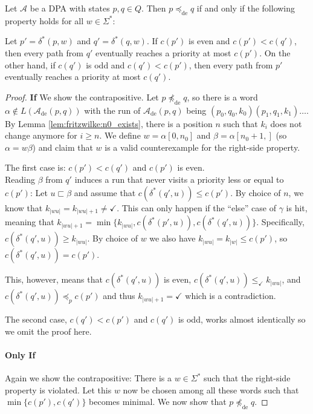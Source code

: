 \begin{lem}
\label{lem:fwe:preceq_alternative}
	Let $\mathcal{A}$ be a DPA with states $p, q \in Q$. Then $p \preceq_\text{de} q$ if and only if the following property holds for all $w \in \Sigma^*$: 
	
	Let $p' = \delta^*(p, w)$ and $q' = \delta^*(q, w)$. If $c(p')$ is even and $c(p') < c(q')$, then every path from $q'$ eventually reaches a priority at most $c(p')$. On the other hand, if $c(q')$ is odd and $c(q') < c(p')$, then every path from $p'$ eventually reaches a priority at most $c(q')$.
\end{lem}

\begin{proof}
	\textbf{If} We show the contrapositive. Let $p \not\preceq_\text{de} q$, so there is a word $\alpha \notin L(\mathcal{A}_\text{de}(p, q))$ with the run of $\mathcal{A}_\text{de}(p, q)$ being $(p_0, q_0, k_0) (p_1, q_1, k_1) \dots$. By Lemma \ref{lem:fritzwilke:n0_exists}, there is a position $n$ such that $k_i$ does not change anymore for $i \geq n$. We define $w = \alpha[0, n_0]$ and $\beta = \alpha[n_0+1, ]$ (so $\alpha = w\beta$) and claim that $w$ is a valid counterexample for the right-side property.
	
	The first case is: $c(p') < c(q')$ and $c(p')$ is even. \\
	Reading $\beta$ from $q'$ induces a run that never visits a priority less or equal to $c(p')$: Let $u \sqsubset \beta$ and assume that $c(\delta^*(q', u)) \leq c(p')$. By choice of $n$, we know that $k_{|wu|} = k_{|wu|+1} \neq \checkmark$. This can only happen if the \enquote{else} case of $\gamma$ is hit, meaning that $k_{|wu|+1} = \min \{ k_{|wu|}, c(\delta^*(p', u)), c(\delta^*(q', u)) \}$. Specifically, $c(\delta^*(q', u)) \geq k_{|wu|}$. By choice of $w$ we also have $k_{|wu|} = k_{|w|} \leq c(p')$, so $c(\delta^*(q', u)) = c(p')$.
	
	This, however, means that $c(\delta^*(q', u))$ is even, $c(\delta^*(q', u)) \leq_\checkmark k_{|wu|}$, and $c(\delta^*(q', u)) \preceq_p c(p')$ and thus $k_{|wu|+1} = \checkmark$ which is a contradiction.
	
	The second case, $c(q') < c(p')$ and $c(q')$ is odd, works almost identically so we omit the proof here.
	
	\paragraph{Only If} Again we show the contrapositive: There is a $w \in \Sigma^*$ such that the right-side property is violated. Let this $w$ now be chosen among all these words such that $\min \{ c(p'), c(q') \}$ becomes minimal. We now show that $p \not\preceq_\text{de} q$. 
	

\end{proof}
